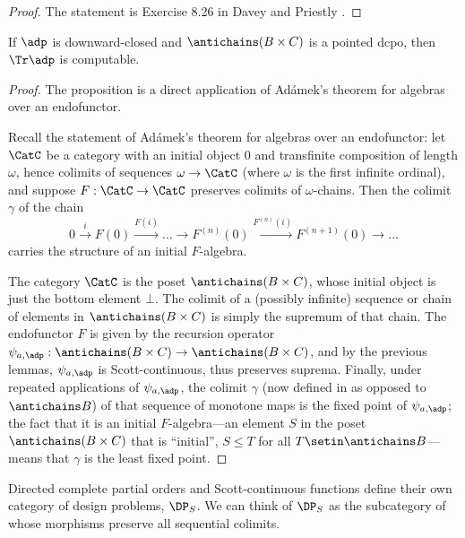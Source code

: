 \begin{proof}
    The statement is Exercise 8.26 in Davey and Priestly \citeXXX.
\end{proof}




\begin{proposition}
    If $\adp$ is downward-closed and $\antichains (B \times C)$ is a pointed dcpo, then $\Tr \adp$ is computable.
\end{proposition}

\begin{proof}
    The proposition is a direct application of Ad\'amek's theorem for algebras over an endofunctor.

    Recall the statement of Ad\'amek's theorem for algebras over an endofunctor: let $\CatC$ be a category with an initial object $0$ and transfinite composition of length $\omega$, hence colimits of sequences $\omega \to \CatC$ (where $\omega$ is the first infinite ordinal), and suppose $F: \CatC \to \CatC$ preserves colimits of $\omega$-chains.
    Then the colimit $\gamma$ of the chain
    \begin{equation}
        0 \overset{i}{\to} F(0) \overset{F(i)}{\to} \ldots \to F^{(n)}(0) \overset{F^{(n)}(i)}{\to} F^{(n+1)}(0) \to \ldots
    \end{equation}
    carries the structure of an initial $F$-algebra.

    The category $\CatC$ is the poset $\antichains (B \times C)$, whose initial object is just the bottom element $\bot$.
    The colimit of a (possibly infinite) sequence or chain of elements in $\antichains (B\times C)$ is simply the supremum of that chain.
    The endofunctor $F$ is given by the recursion operator $\psi_{a,\adp} : \antichains (B\times C) \to \antichains (B\times C)$, and by the previous lemmas, $\psi_{a,\adp}$ is Scott-continuous, thus preserves suprema.
    Finally, under repeated applications of $\psi_{a,\adp}$, the colimit $\gamma$ (now defined in \Pos as opposed to $\antichains B$) of that sequence of monotone maps is the fixed point of $\psi_{a,\adp}$; the fact that it is an initial $F$-algebra---\ie  an element $S$ in the poset $\antichains (B\times C)$ that is ``initial'', \ie  $S \leq T$ for all $T \setin \antichains B$---means that $\gamma$ is the least fixed point.
\end{proof}
Directed complete partial orders and Scott-continuous functions define their own category of design problems, $\DP_S$.
We can think of $\DP_S$ as the subcategory of \DP whose morphisms preserve all sequential colimits.

